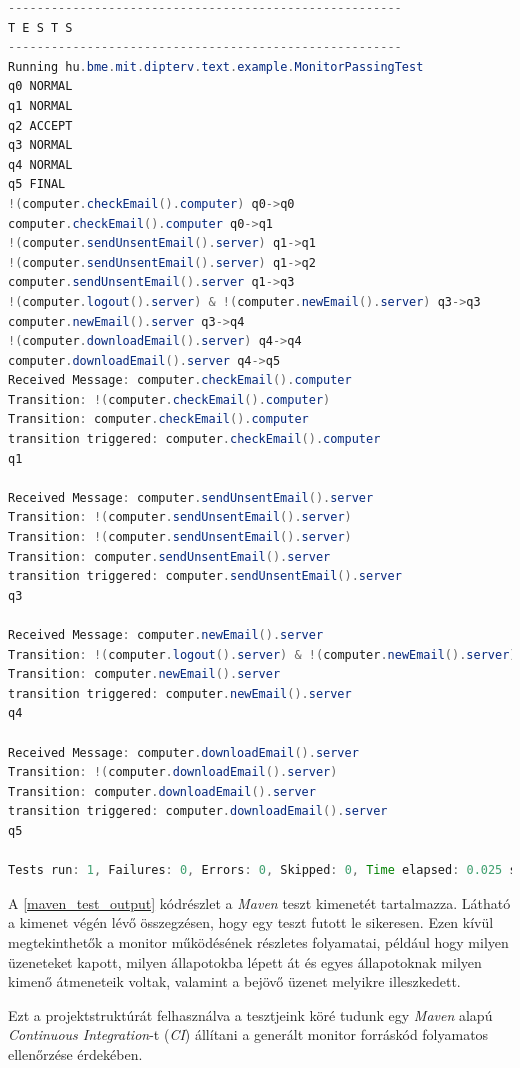 \begin{lstlisting}[language=java, frame=single, float=ht!, caption={Teszteset eredménye.},captionpos=b,label=maven_test_output]
-------------------------------------------------------
T E S T S
-------------------------------------------------------
Running hu.bme.mit.dipterv.text.example.MonitorPassingTest
q0 NORMAL
q1 NORMAL
q2 ACCEPT
q3 NORMAL
q4 NORMAL
q5 FINAL
!(computer.checkEmail().computer) q0->q0
computer.checkEmail().computer q0->q1
!(computer.sendUnsentEmail().server) q1->q1
!(computer.sendUnsentEmail().server) q1->q2
computer.sendUnsentEmail().server q1->q3
!(computer.logout().server) & !(computer.newEmail().server) q3->q3
computer.newEmail().server q3->q4
!(computer.downloadEmail().server) q4->q4
computer.downloadEmail().server q4->q5
Received Message: computer.checkEmail().computer
Transition: !(computer.checkEmail().computer)
Transition: computer.checkEmail().computer
transition triggered: computer.checkEmail().computer
q1

Received Message: computer.sendUnsentEmail().server
Transition: !(computer.sendUnsentEmail().server)
Transition: !(computer.sendUnsentEmail().server)
Transition: computer.sendUnsentEmail().server
transition triggered: computer.sendUnsentEmail().server
q3

Received Message: computer.newEmail().server
Transition: !(computer.logout().server) & !(computer.newEmail().server)
Transition: computer.newEmail().server
transition triggered: computer.newEmail().server
q4

Received Message: computer.downloadEmail().server
Transition: !(computer.downloadEmail().server)
Transition: computer.downloadEmail().server
transition triggered: computer.downloadEmail().server
q5

Tests run: 1, Failures: 0, Errors: 0, Skipped: 0, Time elapsed: 0.025 sec
\end{lstlisting}

A \ref{maven_test_output} kódrészlet a \textit{Maven} teszt kimenetét tartalmazza.
Látható a kimenet végén lévő összegzésen, hogy egy teszt futott le sikeresen.
Ezen kívül megtekinthetők a monitor működésének részletes folyamatai, például hogy milyen üzeneteket kapott, milyen állapotokba lépett át és egyes állapotoknak milyen kimenő átmeneteik voltak, valamint a bejövő üzenet melyikre illeszkedett.

Ezt a projektstruktúrát felhasználva a tesztjeink köré tudunk egy \textit{Maven} alapú \textit{Continuous Integration}-t (\textit{CI}) állítani a generált monitor forráskód folyamatos ellenőrzése érdekében.

